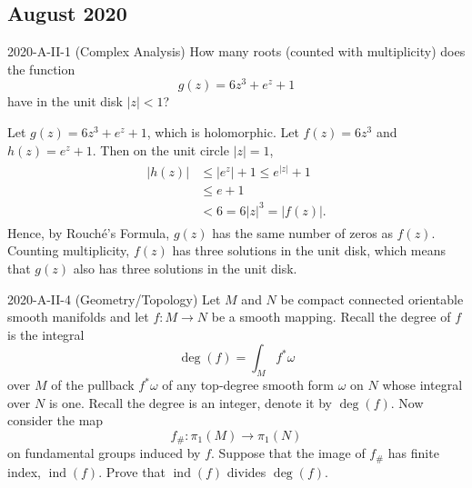 \documentclass{article}
\begin{document}
\subsection{August 2020}
\begin{prb}{2020-A-II-1 (Complex Analysis)}
	How many roots (counted with multiplicity) does the function $$g(z) = 6z^{3} + e^{z} + 1$$ have in the unit disk $|z| < 1$?
\end{prb}
\begin{solutions}
	Let $g(z) = 6z^{3} + e^{z} + 1$, which is holomorphic. Let $f(z) = 6z^{3}$ and $h(z) = e^{z} + 1$. Then on the unit circle $|z| = 1$, 
		\begin{align}
			\begin{split}
				|h(z)| &\leq |e^{z}| + 1 \leq e^{|z|} + 1 \\
				&\leq e + 1 \\
				&< 6 = 6|z|^{3} = |f(z)|. 
			\end{split}
		\end{align} 
	Hence, by Rouch{\'e}'s Formula, $g(z)$ has the same number of zeros as $f(z)$. Counting multiplicity, $f(z)$ has three solutions in the unit disk, which means that $g(z)$ also has three solutions in the unit disk. 
\end{solutions}
\begin{prb}{2020-A-II-4 (Geometry/Topology)}
	Let $M$ and $N$ be compact connected orientable smooth manifolds and let $f: M \to N$ be a smooth mapping. Recall the degree of $f$ is the integral 
		\begin{equation*}
			\deg(f) = \int_{M}f^{\ast}\omega
		\end{equation*}
	over $M$ of the pullback $f^{\ast}\omega$ of any top-degree smooth form $\omega$ on $N$ whose integral over $N$ is one. Recall the degree is an integer, denote it by $\deg(f)$. Now consider the map 
		\begin{equation*}
			f_{\#}: \pi_{1}(M) \to \pi_{1}(N)
		\end{equation*}
	on fundamental groups induced by $f$. Suppose that the image of $f_{\#}$ has finite index, $\operatorname{ind}(f)$. Prove that $\operatorname{ind}(f)$ divides $\deg(f)$. 
\end{prb}
\end{document}
